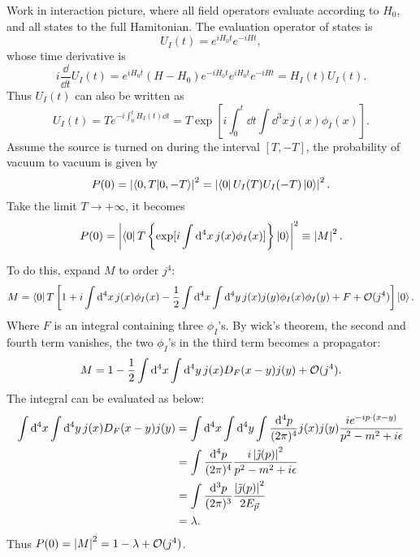 \solution
\begin{problembody}
    \item Work in interaction picture, where all field operators evaluate according to $H_0$, and all states to the full 
    Hamitonian. The evaluation operator of states is
    \begin{equation*}
        U_I(t) = e^{iH_0t} e^{-iHt},
    \end{equation*}
    whose time derivative is
    \begin{equation*}
        i \frac{\dd}{\dd t} U_I(t)
        = e^{iH_0t}(H - H_0)e^{-iH_0t} e^{iH_0t} e^{-iHt}
        = H_I(t) U_I(t).
    \end{equation*}
    Thus $U_I(t)$ can also be written as
    \begin{equation*}
        U_I(t) = T e^{-i \int_0^t H_I(t) \dd t} 
        = T \exp[i\int_0^t \dd t\int \dd^3x \, j(x)\phi_I(x)].
    \end{equation*}
    Assume the source is turned on during the interval $[T, -T]$, the probability of vacuum to vacuum is given by
    \begin{equation*}
        P(0) = \left| \left\langle 0, T \middle| 0, -T \right\rangle \right|^2 = \left| \left\langle 0\right| U_I(T) U_I(-T) \left|0\right\rangle \right|^2.
    \end{equation*}
    Take the limit $T \to +\infty$, it becomes
    \begin{equation*}
        P(0) = \left| 
            \left\langle 0\right| T\left\{
                \exp[
                    i\int \mathrm{d}^4x \, j(x) \phi_I(x)
                ]    
            \right\}\left|0\right\rangle
         \right|^2 \equiv \left| M \right|^2.
    \end{equation*}

    \item To do this, expand $M$ to order $j^4$:
    \begin{equation*}
        M = \left\langle 0\right| T\left[1 
        + i\int \mathrm{d}^4x \, j(x)\phi_I(x) 
        - \frac{1}{2} \int \mathrm{d}^4x \int \mathrm{d}^4y \, j(x)j(y)\phi_I(x)\phi_I(y)
        + F
        + \mathcal{O}(j^4) \right]\left|0\right\rangle.
    \end{equation*}
    Where $F$ is an integral containing three $\phi_I$'s. By wick's theorem, the second and fourth term vanishes, 
    the two $\phi_I$'s in the third term becomes a propagator:
    \begin{equation*}
        M = 1 - \frac{1}{2} \int \mathrm{d}^4x \int \mathrm{d}^4y \, j(x)D_F(x - y)j(y) + \mathcal{O}(j^4).
    \end{equation*}
    The integral can be evaluated as below:
    \begin{align*}
        \int \mathrm{d}^4x \int \mathrm{d}^4y \, j(x)D_F(x - y)j(y)
        & = \int \mathrm{d}^4x \int \mathrm{d}^4y \int \frac{\mathrm{d}^4p}{(2\pi)^4}
        j(x)j(y)\frac{ie^{-ip\cdot(x - y)}}{p^2 - m^2 + i\epsilon}\\
        & = \int \frac{\mathrm{d}^4p}{(2\pi)^4} \frac{i\left| \tilde{\jmath}(p) \right|^2}{p^2 - m^2 + i\epsilon}\\
        & = \int \frac{\mathrm{d}^3p}{(2\pi)^3} \frac{\left| \tilde{\jmath}(p) \right|^2}{2E_{\vec{p}}}\\
        & = \lambda.
    \end{align*}
    Thus $P(0) = \left| M \right|^2 = 1 - \lambda + \mathcal{O}(j^4)$.


\end{problembody}
